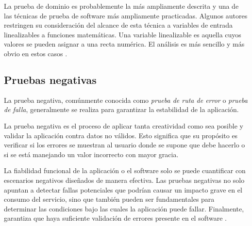 La prueba de dominio es probablemente la más ampliamente descrita y una de las
técnicas de prueba de software más ampliamente practicadas. Algunos autores
restringen su consideración del alcance de esta técnica a variables de entrada
linealizables a funciones matemáticas. Una variable linealizable es aquella
cuyos valores se pueden asignar a una recta numérica. El análisis es más
sencillo y más obvio en estos casos \cite{Kaner}.

\subsection{Pruebas negativas}
La prueba negativa, comúnmente conocida como \emph{prueba de ruta de error} o
\emph{prueba de falla}, generalmente se realiza para garantizar la estabilidad
de la aplicación.

La prueba negativa es el proceso de aplicar tanta creatividad como sea posible y
validar la aplicación contra datos no válidos. Esto significa que su propósito
es verificar si los errores se muestran al usuario donde se supone que debe
hacerlo o si se está manejando un valor incorrecto con mayor gracia.

La fiabilidad funcional de la aplicación o el software solo se puede cuantificar
con escenarios negativos diseñados de manera efectiva. Las pruebas negativas no
solo apuntan a detectar fallas potenciales que podrían causar un impacto grave
en el consumo del servicio, sino que también pueden ser fundamentales para
determinar las condiciones bajo las cuales la aplicación puede fallar.
Finalmente, garantiza que haya suficiente validación de errores presente en el
software \cite{Nadig}.

